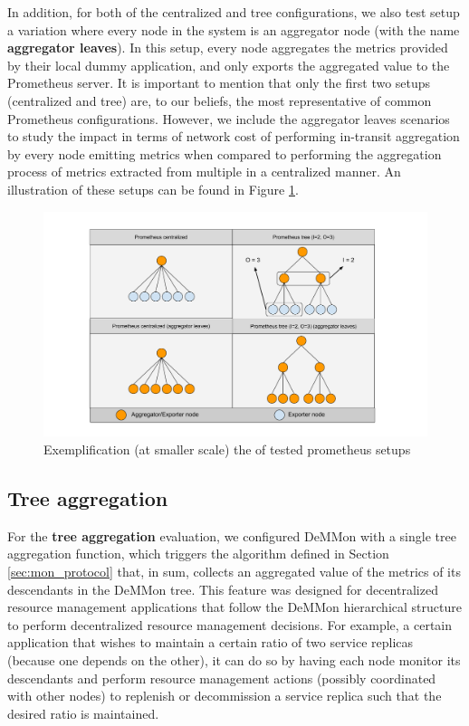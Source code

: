 In addition, for both of the centralized and tree configurations, we also test setup a variation where every node in the system is an aggregator node (with the name \textbf{aggregator leaves}). In this setup, every node aggregates the metrics provided by their local dummy application, and only exports the aggregated value to the Prometheus server. It is important to mention that only the first two setups (centralized and tree) are, to our beliefs, the most representative of common Prometheus configurations.  However, we include the aggregator leaves scenarios to study the impact in terms of network cost of performing in-transit aggregation by every node emitting metrics when compared to performing the aggregation process of metrics extracted from multiple in a centralized manner. An illustration of these setups can be found in Figure \ref{fig:sec:eval_prom_setups}.

\begin{figure}
    \centering
    \includegraphics[width=\linewidth]{Chapters/evaluation/figures/aggregation/Prometheus setups.pdf}
    \caption{Exemplification (at smaller scale) the of tested prometheus setups}
    \label{fig:sec:eval_prom_setups}
\end{figure}

\subsection{Tree aggregation}

For the \textbf{tree aggregation} evaluation, we configured DeMMon with a single tree aggregation function, which triggers the algorithm defined in Section \ref{sec:mon_protocol} that, in sum, collects an aggregated value of the metrics of its descendants in the DeMMon tree. This feature was designed for decentralized resource management applications that follow the DeMMon hierarchical structure to perform decentralized resource management decisions. For example, a certain application that wishes to maintain a certain ratio of two service replicas (because one depends on the other), it can do so by having each node monitor its descendants and perform resource management actions (possibly coordinated with other nodes) to replenish or decommission a service replica such that the desired ratio is maintained.

